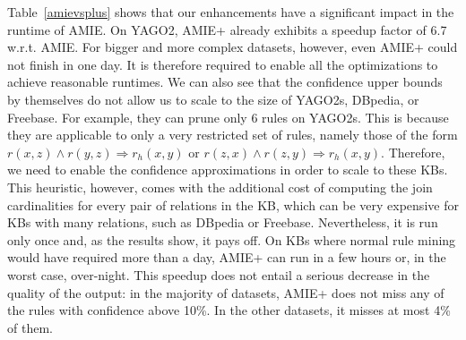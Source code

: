 {Table~\ref{amievsplus} shows that our enhancements have a significant impact in the runtime of AMIE.
On YAGO2, AMIE+ already exhibits a speedup factor of 6.7 w.r.t. AMIE.
For bigger and more complex datasets, however, even AMIE+  could not finish in one day. 
It is therefore required to enable all the optimizations to achieve reasonable runtimes.
We can also see that the confidence upper bounds by themselves do not allow us to scale to the size of YAGO2s, DBpedia, or Freebase.
For example, they can prune only 6 rules on YAGO2s.
This is because they are applicable to only a very restricted set of rules, namely those of the form $r(x,z) \wedge r(y,z) \Rightarrow r_h(x,y)$ or
$r(z,x) \wedge r(z,y) \Rightarrow r_h(x,y)$.
Therefore, we need to enable the confidence approximations in order to scale to these KBs.
This heuristic, however, comes with the additional cost of computing the
join cardinalities for every pair of relations in the KB, which can be very expensive for KBs with many relations, such as DBpedia or Freebase.
Nevertheless, it is run only once and, as the results show, it pays off.
On KBs where normal rule mining would have required more than a day, 
AMIE+ can run in a few hours or, in the worst case, over-night.
This speedup does not entail a serious decrease in the quality of the output: 
in the majority of datasets, AMIE+ does not miss any of the rules with confidence above 10\%. 
In the other datasets, it misses at most 4\% of them.
}

